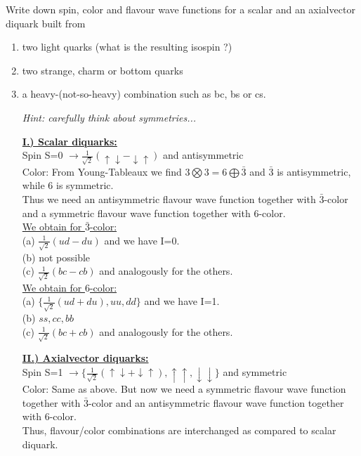 Write down spin, color and flavour wave functions for a scalar and an axialvector diquark built from 

\begin{enumerate}
	\item two light quarks (what is the resulting isospin ?)
	\item two strange, charm or bottom quarks
	\item a heavy-(not-so-heavy) combination such as bc, bs or cs.
	      
		      {\em Hint: carefully think about symmetries...}
	      
	      \begin{solution}
		      \underline{\bf I.) Scalar diquarks:}\\
		      Spin S=0 $\rightarrow \frac{1}{\sqrt{2}} \left(	\uparrow \downarrow - \downarrow\uparrow \right)$ and antisymmetric\\
		      Color: From Young-Tableaux we find $3 \bigotimes 3 = 6 \bigoplus \bar{3}$ and $\bar{3}$ is antisymmetric, while $6$ is symmetric.\\
		      Thus we need an antisymmetric flavour wave function together with $\bar{3}$-color and a symmetric flavour wave function together with
		      $6$-color.\\ 
		      \underline{We obtain for $\bar{3}$-color:}\\
		      (a) $ \frac{1}{\sqrt{2}} \left(	ud-du \right)$ and we have I=0.\\
		      (b) not possible\\
		      (c) $ \frac{1}{\sqrt{2}} \left(	bc-cb \right)$ and analogously for the others.\\ 
		      \underline{We obtain for $6$-color:}\\
		      (a) $\{ \frac{1}{\sqrt{2}} \left(	ud+du \right), uu, dd\}$ and we have I=1.\\
		      (b) $ss, cc, bb$\\
		      (c) $ \frac{1}{\sqrt{2}} \left(	bc+cb \right)$ and analogously for the others.\\\vspace*{-1mm}
		      
		      \underline{\bf II.) Axialvector diquarks:}\\
		      Spin S=1 $\rightarrow \{\frac{1}{\sqrt{2}} \left(	\uparrow \downarrow + \downarrow\uparrow \right), \uparrow\uparrow,\downarrow\downarrow \}$ and symmetric\\
		      Color: Same as above. But now we need a symmetric flavour wave function together with $\bar{3}$-color and 
		      an antisymmetric flavour wave function together with $6$-color.\\
		      Thus, flavour/color combinations are interchanged as compared to scalar diquark. 
	      \end{solution}
	      
	      
\end{enumerate}